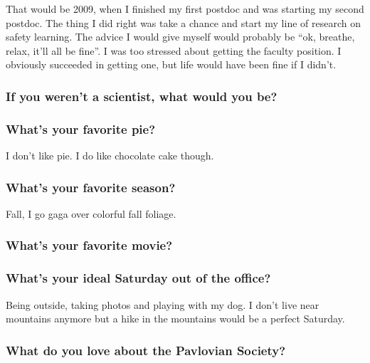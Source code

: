 \documentclass[]{article}
\begin{document}
That would be 2009, when I finished my first postdoc and was starting my
second postdoc. The thing I did right was take a chance and start my
line of research on safety learning. The advice I would give myself
would probably be ``ok, breathe, relax, it'll all be fine''. I was too
stressed about getting the faculty position. I obviously succeeded in
getting one, but life would have been fine if I didn't.

\subsubsection{\texorpdfstring{\textbf{If you weren't a scientist, what
would you
be?}}{If you weren't a scientist, what would you be?}}\label{if-you-werent-a-scientist-what-would-you-be}

\subsubsection{\texorpdfstring{\textbf{What's your favorite
pie?}}{What's your favorite pie?}}\label{whats-your-favorite-pie}

I don't like pie. I do like chocolate cake though.

\subsubsection{\texorpdfstring{\textbf{What's your favorite
season?}}{What's your favorite season?}}\label{whats-your-favorite-season}

Fall, I go gaga over colorful fall foliage.

\subsubsection{\texorpdfstring{\textbf{What's your favorite
movie?}}{What's your favorite movie?}}\label{whats-your-favorite-movie}

\subsubsection{\texorpdfstring{\textbf{What's your ideal Saturday out of
the
office?}}{What's your ideal Saturday out of the office?}}\label{whats-your-ideal-saturday-out-of-the-office}

Being outside, taking photos and playing with my dog. I don't live near
mountains anymore but a hike in the mountains would be a perfect
Saturday.

\subsubsection{\texorpdfstring{\textbf{What do you love about the
Pavlovian
Society?}}{What do you love about the Pavlovian Society?}}\label{what-do-you-love-about-the-pavlovian-society}
\end{document}
